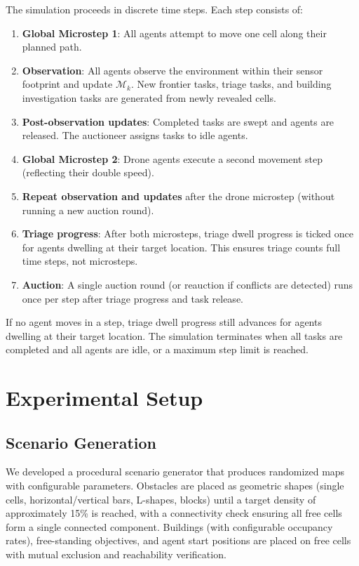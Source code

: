 \documentclass[conference]{IEEEtran}
\begin{document}
The simulation proceeds in discrete time steps. Each step consists of:
\begin{enumerate}
    \item \textbf{Global Microstep 1}: All agents attempt to move one cell along their planned path.
    \item \textbf{Observation}: All agents observe the environment within their sensor footprint and update $\mathcal{M}_k$. New frontier tasks, triage tasks, and building investigation tasks are generated from newly revealed cells.
    \item \textbf{Post-observation updates}: Completed tasks are swept and agents are released. The auctioneer assigns tasks to idle agents.
    \item \textbf{Global Microstep 2}: Drone agents execute a second movement step (reflecting their double speed).
    \item \textbf{Repeat observation and updates} after the drone microstep (without running a new auction round).
    \item \textbf{Triage progress}: After both microsteps, triage dwell progress is ticked once for agents dwelling at their target location. This ensures triage counts full time steps, not microsteps.
    \item \textbf{Auction}: A single auction round (or reauction if conflicts are detected) runs once per step after triage progress and task release.
\end{enumerate}

If no agent moves in a step, triage dwell progress still advances for agents dwelling at their target location. The simulation terminates when all tasks are completed and all agents are idle, or a maximum step limit is reached.

\section{Experimental Setup}

\subsection{Scenario Generation}

We developed a procedural scenario generator that produces randomized maps with configurable parameters. Obstacles are placed as geometric shapes (single cells, horizontal/vertical bars, L-shapes, blocks) until a target density of approximately 15\% is reached, with a connectivity check ensuring all free cells form a single connected component. Buildings (with configurable occupancy rates), free-standing objectives, and agent start positions are placed on free cells with mutual exclusion and reachability verification.
\end{document}

